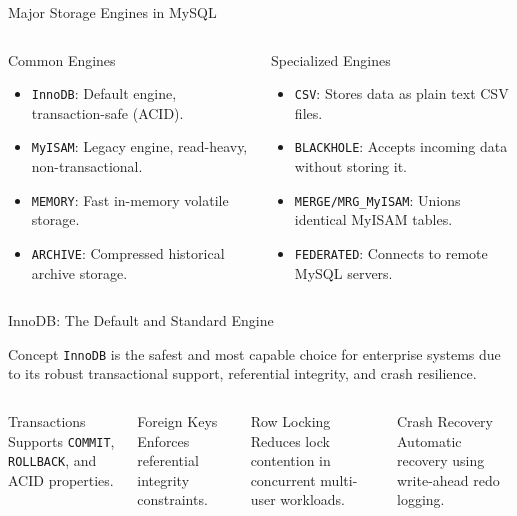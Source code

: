 \documentclass[aspectratio=169,11pt]{beamer}
\newcommand{\code}[1]{\texttt{#1}}
\newcommand{\smallitem}{\setlength{\itemsep}{2pt}}
\begin{document}
\begin{frame}{Major Storage Engines in MySQL}
\begin{columns}[T,onlytextwidth]
\begin{block}{Common Engines}
\begin{itemize}\smallitem
  \item \code{InnoDB}: Default engine, transaction-safe (ACID).
  \item \code{MyISAM}: Legacy engine, read-heavy, non-transactional.
  \item \code{MEMORY}: Fast in-memory volatile storage.
  \item \code{ARCHIVE}: Compressed historical archive storage.
\end{itemize}
\end{block}
\begin{block}{Specialized Engines}
\begin{itemize}\smallitem
  \item \code{CSV}: Stores data as plain text CSV files.
  \item \code{BLACKHOLE}: Accepts incoming data without storing it.
  \item \code{MERGE/MRG\_MyISAM}: Unions identical MyISAM tables.
  \item \code{FEDERATED}: Connects to remote MySQL servers.
\end{itemize}
\end{block}
\end{columns}
\end{frame}

\begin{frame}{InnoDB: The Default and Standard Engine}
\begin{block}{Concept}
\code{InnoDB} is the safest and most capable choice for enterprise systems due to its robust transactional support, referential integrity, and crash resilience.
\end{block}
\begin{columns}[T,onlytextwidth]
\begin{block}{Transactions}
\small Supports \code{COMMIT}, \code{ROLLBACK}, and ACID properties.
\end{block}
\begin{block}{Foreign Keys}
\small Enforces referential integrity constraints.
\end{block}
\begin{block}{Row Locking}
\small Reduces lock contention in concurrent multi-user workloads.
\end{block}
\begin{block}{Crash Recovery}
\small Automatic recovery using write-ahead redo logging.
\end{block}
\end{columns}
\end{frame}
\end{document}
